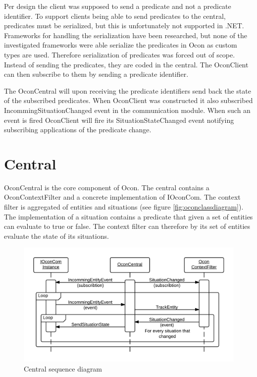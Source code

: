 \documentclass[../report.tex]{subfiles}
\begin{document}
Per design the client was supposed to send a predicate and not a predicate identifier. To support clients being able to send predicates to the central, predicates must be serialized, but this is unfortunately not supported in .NET. Frameworks for handling the serialization have been researched, but none of the investigated frameworks were able serialize the predicates in Ocon as custom types are used. Therefore serialization of predicates was forced out of scope. Instead of sending the predicates, they are coded in the central. The OconClient can then subscribe to them by sending a predicate identifier. 

The OconCentral will upon receiving the predicate identifiers send back the state of the subscribed predicates. When OconClient was constructed it also subscribed IncommingSituationChanged event in the communication module. When such an event is fired OconClient will fire its SituationStateChanged event notifying subscribing applications of the predicate change.


\section{Central}
OconCentral is the core component of Ocon. The central contains a OconContextFilter and a concrete implementation of IOconCom. The context filter is aggregated of entities and situations (see figure \ref{fig:oconclassdiagram}). The implementation of a situation contains a predicate that given a set of entities can evaluate to true or false. The context filter can therefore by its set of entities evaluate the state of its situations.

\begin{figure}
\centering
\includegraphics[width=\linewidth]{sequencediagram-central.png}
\caption{Central sequence diagram}
\label{fig:seqcentral}
\end{figure}
\end{document}
